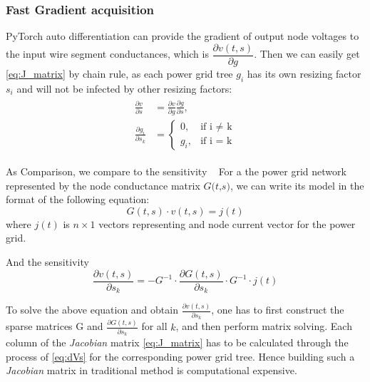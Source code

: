 \subsubsection{Fast Gradient acquisition}
PyTorch auto differentiation can provide the gradient of output node voltages to the input wire segment conductances, which is $ \dfrac{\partial v(t, s)}{\partial g}$. Then we can easily get \eqref{eq:J_matrix} by chain rule, as each power grid tree $g_{i}$ has its own resizing factor $s_{i}$ and will not be infected by other resizing factors:
\begin{equation}
	\label{eq:chain_rule}
	\begin{aligned}
	\begin{split}
	\frac{\partial v}{\partial s} & =\frac{\partial v}{\partial g} \frac{\partial g}{\partial s}, \\ 
	\frac{\partial g_{i}}{\partial s_{k}} & = 
    	\begin{cases}
        		0,      &\mbox{if i $\neq$ k} \\ 
        		g_{i},  &\mbox{if i = k} 
    	\end{cases}
	\end{split}
	\end{aligned}
\end{equation}



As Comparison, we compare to the sensitivity ~\cite{Sukharev:2019pg}
For a the power grid network represented by the node conductance matrix $ \textit{G(t,s)}$, we can write its model in the format of the following equation:
\begin{equation}
	\label{eq:gv=i}
	G(t,s)\cdot v(t,s)= j(t)
\end{equation}
where $j(t)$  is $n\times 1$ vectors representing and node current vector for the power grid.

And the sensitivity 
\begin{equation}
	\label{eq:dVs}
	\dfrac{\partial v(t,s)}{\partial s_{k}} = -G^{-1}\cdot \dfrac{\partial G(t,s)}{\partial s_{k}}  \cdot G^{-1}\cdot j(t)
\end{equation}


To solve the above equation and obtain $ \frac{\partial v(t,s)}{\partial s_{k}}$, one has to first construct the sparse matrices G and $\frac{\partial G(t,s)}{\partial s_{k}}$ for all $k$, and then perform matrix solving. 
Each column of the  \textit{Jacobian} matrix \eqref{eq:J_matrix} has to be calculated through the process of \eqref{eq:dVs} for the corresponding power grid tree. Hence building such a \textit{Jacobian} matrix in traditional method is computational expensive.






